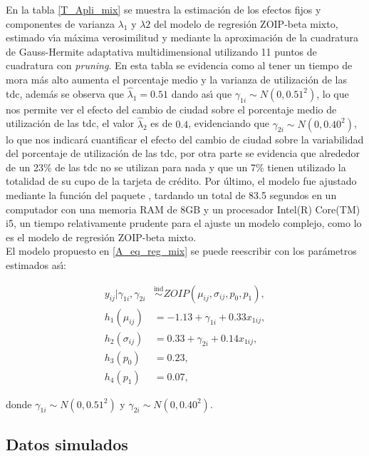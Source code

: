 En la tabla \ref{T_Apli_mix} se muestra la estimaci\'{o}n de los efectos fijos y componentes de varianza $\lambda_1$ y $\lambda2$ del modelo de regresi\'{o}n ZOIP-beta mixto, estimado v\'{\i}a m\'{a}xima verosimilitud y mediante la aproximaci\'{o}n de la cuadratura de Gauss-Hermite adaptativa multidimensional utilizando 11 puntos de cuadratura con \textit{pruning}. En esta tabla se evidencia como al tener un tiempo de mora m\'{a}s alto aumenta el porcentaje medio y la varianza de utilizaci\'{o}n de las tdc, adem\'{a}s se observa que $\hat{\lambda}_1=0.51$ dando as\'{\i} que $\gamma_{1i} \sim N(0, 0.51^2)$, lo que nos permite ver el efecto del cambio de ciudad sobre el porcentaje medio de utilizaci\'{o}n de las tdc, el valor $\hat{\lambda}_2$ es de $0.4$, evidenciando que $\gamma_{2i} \sim N(0, 0.40^2)$, lo que nos indicar\'{a} cuantificar el efecto del cambio de ciudad sobre la variabilidad del porcentaje de utilizaci\'{o}n de las tdc, por otra parte se evidencia que alrededor de un 23\% de las tdc no se utilizan para nada y que un 7\% tienen utilizado la totalidad de su cupo de la tarjeta de cr\'{e}dito. Por \'{u}ltimo, el modelo fue ajustado mediante la funci\'{o}n  del paquete , tardando un total de 83.5 segundos en un computador con una memoria RAM de 8GB y un procesador Intel(R) Core(TM) i5, un tiempo relativamente prudente para el ajuste un modelo complejo, como lo es el modelo de regresi\'{o}n ZOIP-beta mixto.\\

El modelo propuesto en \eqref{A_eq_reg_mix} se puede reescribir con los par\'{a}metros estimados as\'{\i}:

\begin{equation}
\begin{split}
y_{ij}| \gamma_{1i},\gamma_{2i} & \overset{\text{ind}}{\sim} ZOIP(\mu_{ij},\sigma_{ij},p_0, p_1),\\
h_1(\mu_{ij})&=-1.13+\gamma_{1i}+0.33 x_{1ij},\\
h_2(\sigma_{ij})&=0.33+\gamma_{2i}+0.14 x_{1ij},\\
h_3(p_{0})&=0.23,\\
h_4(p_{1})&=0.07,
\end{split}
\label{A_eq_reg_mix2}
\end{equation}

donde $\gamma_{1i} \sim N(0, 0.51^2)$ y $\gamma_{2i} \sim N(0, 0.40^2)$.

\subsection{Datos simulados}

